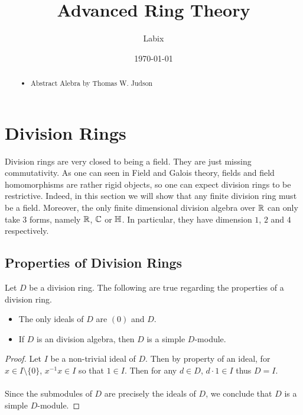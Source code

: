 \documentclass[a4paper]{article}
\title{Advanced Ring Theory}
\author{Labix}
\date{\today}
\begin{document}
\maketitle
\begin{abstract}
\begin{itemize}
\item Abstract Alebra by Thomas W. Judson
\end{itemize}
\end{abstract}
\pagebreak
\tableofcontents

\pagebreak

\section{Division Rings}
Division rings are very closed to being a field. They are just missing commutativity. As one can seen in Field and Galois theory, fields and field homomorphisms are rather rigid objects, so one can expect division rings to be restrictive. Indeed, in this section we will show that any finite division ring must be a field. Moreover, the only finite dimensional division algebra over $\mathbb{R}$ can only take $3$ forms, namely $\mathbb{R}$, $\mathbb{C}$ or $\mathbb{H}$. In particular, they have dimension $1$, $2$ and $4$ respectively. 

\subsection{Properties of Division Rings}
\begin{prp}{}{} Let $D$ be a division ring. The following are true regarding the properties of a division ring. 
\begin{itemize}
\item The only ideals of $D$ are $(0)$ and $D$. 
\item If $D$ is an division algebra, then $D$ is a simple $D$-module. 
\end{itemize} \tcbline
\begin{proof}
Let $I$ be a non-trivial ideal of $D$. Then by property of an ideal, for $x\in I\setminus\{0\}$, $x^{-1}x\in I$ so that $1\in I$. Then for any $d\in D$, $d\cdot 1\in I$ thus $D=I$. \\~\\

Since the submodules of $D$ are precisely the ideals of $D$, we conclude that $D$ is a simple $D$-module. 
\end{proof}
\end{prp}
\end{document}
